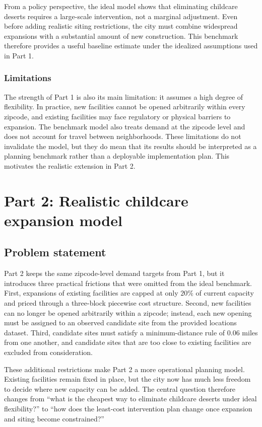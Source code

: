 \documentclass[11pt]{article}
\newcommand{\1}{\mathbb{I}}
\begin{document}
From a policy perspective, the ideal model shows that eliminating childcare deserts requires a large-scale intervention, not a marginal adjustment. Even before adding realistic siting restrictions, the city must combine widespread expansions with a substantial amount of new construction. This benchmark therefore provides a useful baseline estimate under the idealized assumptions used in Part 1.

\subsubsection{Limitations}

The strength of Part 1 is also its main limitation: it assumes a high degree of flexibility. In practice, new facilities cannot be opened arbitrarily within every zipcode, and existing facilities may face regulatory or physical barriers to expansion. The benchmark model also treats demand at the zipcode level and does not account for travel between neighborhoods. These limitations do not invalidate the model, but they do mean that its results should be interpreted as a planning benchmark rather than a deployable implementation plan. This motivates the realistic extension in Part 2.

\section{Part 2: Realistic childcare expansion model}

\subsection{Problem statement}

Part 2 keeps the same zipcode-level demand targets from Part 1, but it introduces three practical frictions that were omitted from the ideal benchmark. First, expansions of existing facilities are capped at only \(20\%\) of current capacity and priced through a three-block piecewise cost structure. Second, new facilities can no longer be opened arbitrarily within a zipcode; instead, each new opening must be assigned to an observed candidate site from the provided locations dataset. Third, candidate sites must satisfy a minimum-distance rule of \(0.06\) miles from one another, and candidate sites that are too close to existing facilities are excluded from consideration.

These additional restrictions make Part 2 a more operational planning model. Existing facilities remain fixed in place, but the city now has much less freedom to decide where new capacity can be added. The central question therefore changes from ``what is the cheapest way to eliminate childcare deserts under ideal flexibility?'' to ``how does the least-cost intervention plan change once expansion and siting become constrained?''
\end{document}
